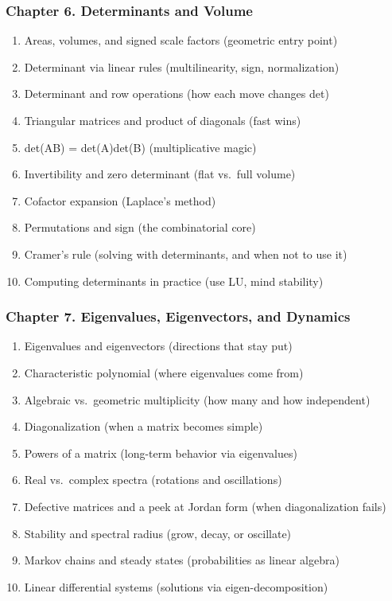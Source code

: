 \documentclass[
  letterpaper,
  DIV=11,
  numbers=noendperiod]{scrreprt}
\providecommand{\tightlist}{%
  \setlength{\itemsep}{0pt}\setlength{\parskip}{0pt}}
\begin{document}
\subsubsection{Chapter 6. Determinants and
Volume}\label{chapter-6.-determinants-and-volume}

\begin{enumerate}
\def\labelenumi{\arabic{enumi}.}
\setcounter{enumi}{50}
\tightlist
\item
  Areas, volumes, and signed scale factors (geometric entry point)
\item
  Determinant via linear rules (multilinearity, sign, normalization)
\item
  Determinant and row operations (how each move changes det)
\item
  Triangular matrices and product of diagonals (fast wins)
\item
  det(AB) = det(A)det(B) (multiplicative magic)
\item
  Invertibility and zero determinant (flat vs.~full volume)
\item
  Cofactor expansion (Laplace's method)
\item
  Permutations and sign (the combinatorial core)
\item
  Cramer's rule (solving with determinants, and when not to use it)
\item
  Computing determinants in practice (use LU, mind stability)
\end{enumerate}

\subsubsection{Chapter 7. Eigenvalues, Eigenvectors, and
Dynamics}\label{chapter-7.-eigenvalues-eigenvectors-and-dynamics}

\begin{enumerate}
\def\labelenumi{\arabic{enumi}.}
\setcounter{enumi}{60}
\tightlist
\item
  Eigenvalues and eigenvectors (directions that stay put)
\item
  Characteristic polynomial (where eigenvalues come from)
\item
  Algebraic vs.~geometric multiplicity (how many and how independent)
\item
  Diagonalization (when a matrix becomes simple)
\item
  Powers of a matrix (long-term behavior via eigenvalues)
\item
  Real vs.~complex spectra (rotations and oscillations)
\item
  Defective matrices and a peek at Jordan form (when diagonalization
  fails)
\item
  Stability and spectral radius (grow, decay, or oscillate)
\item
  Markov chains and steady states (probabilities as linear algebra)
\item
  Linear differential systems (solutions via eigen-decomposition)
\end{enumerate}
\end{document}
